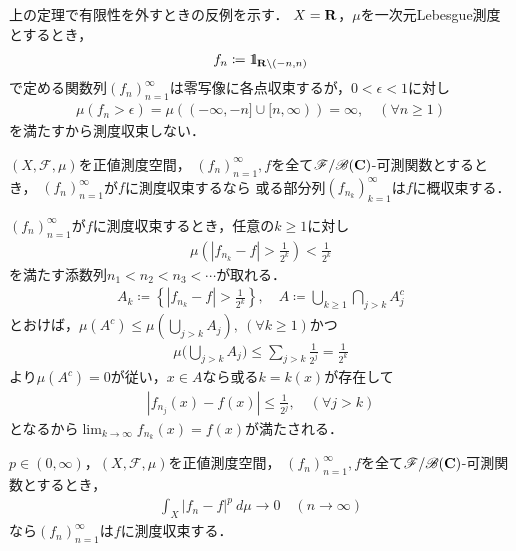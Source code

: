 		上の定理で有限性を外すときの反例を示す．
		$X = \mathbf{R}$，$\mu$を一次元Lebesgue測度とするとき，
		\begin{align}
			f_n \coloneqq \mbox{1}\hspace{-0.25em}\mbox{l}_{\mathbf{R} \backslash (-n,n)}
		\end{align}
		で定める関数列$(f_n)_{n=1}^\infty$は零写像に各点収束するが，$0 < \epsilon < 1$に対し
		\begin{align}
			\mu\left( f_n > \epsilon \right) = \mu((-\infty,-n] \cup [n,\infty)) = \infty,
			\quad (\forall n \geq 1)
		\end{align}
		を満たすから測度収束しない．
		
		\begin{screen}
			\begin{thm}[測度収束列の概収束部分列]\label{thm:convergence_in_measure_then_convergence_almost_everywhere}
				$(X,\mathscr{F},\mu)$を正値測度空間，
				$(f_n)_{n=1}^\infty,f$を全て$\mathscr{F}/\mathscr{B}(\mathbf{C})$-可測関数とするとき，
				$(f_n)_{n=1}^\infty$が$f$に測度収束するなら
				或る部分列$(f_{n_k})_{k=1}^\infty$は$f$に概収束する．
			\end{thm}
		\end{screen}
		
		\begin{prf}
			$(f_n)_{n=1}^\infty$が$f$に測度収束するとき，任意の$k \geq 1$に対し
			\begin{align}
				\mu\left( |f_{n_k} - f| > \frac{1}{2^k}\right) < \frac{1}{2^k}
			\end{align}
			を満たす添数列$n_1 < n_2 < n_3 < \cdots$が取れる．
			\begin{align}
				A_k \coloneqq \left\{|f_{n_k} - f| > \frac{1}{2^k}\right\},
				\quad A \coloneqq \bigcup_{k\geq1} \bigcap_{j>k} A_j^c
			\end{align}
			とおけば，$\mu(A^c) \leq \mu\left(\bigcup_{j>k} A_j\right),\ (\forall k \geq 1)$かつ
			\begin{align}
				\mu\Biggl(\bigcup_{j>k} A_j\Biggr) \leq \sum_{j>k} \frac{1}{2^j}
				= \frac{1}{2^k}
			\end{align}
			より$\mu(A^c) = 0$が従い，$x \in A$なら或る$k = k(x)$が存在して
			\begin{align}
				|f_{n_j}(x) - f(x)| \leq \frac{1}{2^j}, \quad (\forall j > k)
			\end{align}
			となるから$\lim_{k \to \infty} f_{n_k}(x) = f(x)$が満たされる．
			\QED
		\end{prf}
		
		\begin{screen}
			\begin{thm}[平均収束すれば測度収束する]
				$p \in (0,\infty)$，$(X,\mathscr{F},\mu)$を正値測度空間，
				$(f_n)_{n=1}^\infty,f$を全て$\mathscr{F}/\mathscr{B}(\mathbf{C})$-可測関数とするとき，
				\begin{align}
					\int_X |f_n - f|^p\ d\mu \longrightarrow 0
					\quad (n \longrightarrow \infty)
				\end{align}
				なら$(f_n)_{n=1}^\infty$は$f$に測度収束する．
			\end{thm}
		\end{screen}
		
